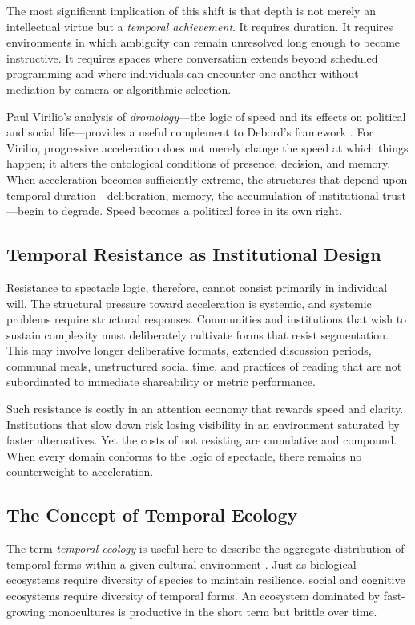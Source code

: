 \documentclass[12pt]{article}
\theoremstyle{definition}
\theoremstyle{plain}
\begin{document}
The most significant implication of this shift is that depth is not merely an intellectual virtue but a \emph{temporal achievement}. It requires duration. It requires environments in which ambiguity can remain unresolved long enough to become instructive. It requires spaces where conversation extends beyond scheduled programming and where individuals can encounter one another without mediation by camera or algorithmic selection.

Paul Virilio's analysis of \emph{dromology}---the logic of speed and its effects on political and social life---provides a useful complement to Debord's framework \citep{Virilio1986}. For Virilio, progressive acceleration does not merely change the speed at which things happen; it alters the ontological conditions of presence, decision, and memory. When acceleration becomes sufficiently extreme, the structures that depend upon temporal duration---deliberation, memory, the accumulation of institutional trust---begin to degrade. Speed becomes a political force in its own right.

\subsection{Temporal Resistance as Institutional Design}

Resistance to spectacle logic, therefore, cannot consist primarily in individual will. The structural pressure toward acceleration is systemic, and systemic problems require structural responses. Communities and institutions that wish to sustain complexity must deliberately cultivate forms that resist segmentation. This may involve longer deliberative formats, extended discussion periods, communal meals, unstructured social time, and practices of reading that are not subordinated to immediate shareability or metric performance.

Such resistance is costly in an attention economy that rewards speed and clarity. Institutions that slow down risk losing visibility in an environment saturated by faster alternatives. Yet the costs of not resisting are cumulative and compound. When every domain conforms to the logic of spectacle, there remains no counterweight to acceleration.

\subsection{The Concept of Temporal Ecology}

The term \emph{temporal ecology} is useful here to describe the aggregate distribution of temporal forms within a given cultural environment \citep{Hassan2003}. Just as biological ecosystems require diversity of species to maintain resilience, social and cognitive ecosystems require diversity of temporal forms. An ecosystem dominated by fast-growing monocultures is productive in the short term but brittle over time.
\end{document}
